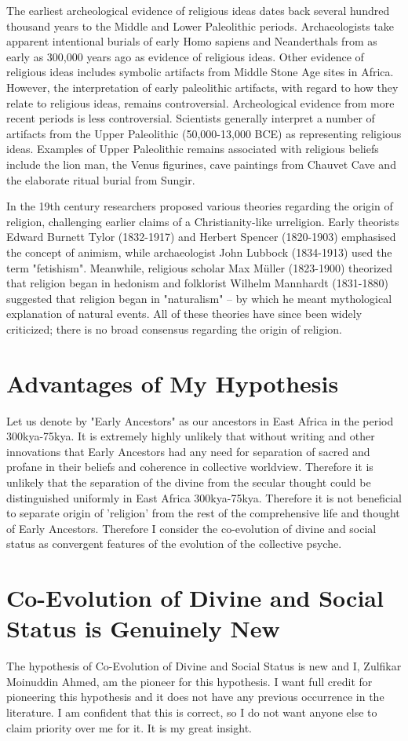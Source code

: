 \documentclass{amsart}
\begin{document}
The earliest archeological evidence of religious ideas dates back several hundred thousand years to the Middle and Lower Paleolithic periods. Archaeologists take apparent intentional burials of early Homo sapiens and Neanderthals from as early as 300,000 years ago as evidence of religious ideas. Other evidence of religious ideas includes symbolic artifacts from Middle Stone Age sites in Africa. However, the interpretation of early paleolithic artifacts, with regard to how they relate to religious ideas, remains controversial. Archeological evidence from more recent periods is less controversial. Scientists generally interpret a number of artifacts from the Upper Paleolithic (50,000-13,000 BCE) as representing religious ideas. Examples of Upper Paleolithic remains associated with religious beliefs include the lion man, the Venus figurines, cave paintings from Chauvet Cave and the elaborate ritual burial from Sungir.

In the 19th century researchers proposed various theories regarding the origin of religion, challenging earlier claims of a Christianity-like urreligion. Early theorists Edward Burnett Tylor (1832-1917) and Herbert Spencer (1820-1903) emphasised the concept of animism, while archaeologist John Lubbock (1834-1913) used the term "fetishism". Meanwhile, religious scholar Max Müller (1823-1900) theorized that religion began in hedonism and folklorist Wilhelm Mannhardt (1831-1880) suggested that religion began in "naturalism" – by which he meant mythological explanation of natural events. All of these theories have since been widely criticized; there is no broad consensus regarding the origin of religion.

\section{Advantages of My Hypothesis}

Let us denote by "Early Ancestors" as our ancestors in East Africa in the period 300kya-75kya. It is extremely highly unlikely that without writing and other innovations that Early Ancestors had any need for separation of sacred and profane in their beliefs and coherence in collective worldview.  Therefore it is unlikely that the separation of the divine from the secular thought could be distinguished uniformly in East Africa 300kya-75kya.  Therefore it is not beneficial to separate origin of 'religion' from the rest of the comprehensive life and thought of Early Ancestors.  Therefore I consider the co-evolution of divine and social status as convergent features of the evolution of the collective psyche.

\section{Co-Evolution of Divine and Social Status is Genuinely New}

The hypothesis of Co-Evolution of Divine and Social Status is new and I, Zulfikar Moinuddin Ahmed, am the pioneer for this hypothesis.  I want full credit for pioneering this hypothesis and it does not have any previous occurrence in the literature.  I am confident that this is correct, so I do not want anyone else to claim priority over me for it.  It is my great insight.
\end{document}
